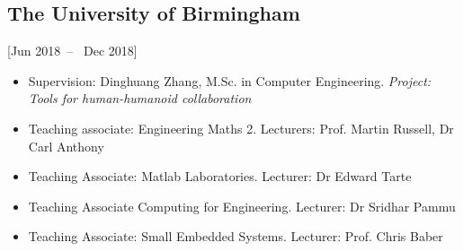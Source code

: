 \documentclass{mycv}
\begin{document}





\subsection{The University of Birmingham}[Jun 2018~--~ Dec 2018]


\begin{itemize}
\item 	Supervision: Dinghuang Zhang, M.Sc. in Computer Engineering. 
	\textit{Project: Tools for human-humanoid collaboration}
\item Teaching associate: Engineering Maths 2. Lecturers: Prof. Martin Russell, Dr Carl Anthony 
\item Teaching Associate: Matlab Laboratories. Lecturer: Dr Edward Tarte  
\item Teaching Associate Computing for Engineering. Lecturer: Dr Sridhar Pammu  
\item Teaching Associate: Small Embedded Systems. Lecturer: Prof. Chris Baber   
\end{itemize}
\end{document}
